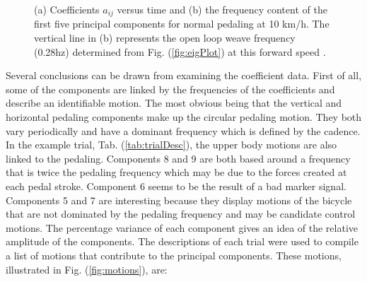 \begin{figure}[tb]
    \begin{center}
    \end{center}
    \caption{(a) Coefficients $a_{ij}$ versus time and (b) the frequency
    content of the first five principal components for normal pedaling at 10
    km/h. The vertical line in (b) represents the open loop weave frequency
    (0.28hz) determined from Fig. (\ref{fig:eigPlot}) at this forward speed .}
    \label{fig:3062}
\end{figure}
Several conclusions can be drawn from examining the coefficient data. First of
all, some of the components are linked by the frequencies of the coefficients
and describe an identifiable motion. The most obvious being that the vertical
and horizontal pedaling components make up the circular pedaling motion. They
both vary periodically and have a dominant frequency which is defined by the
cadence. In the example trial, Tab. (\ref{tab:trialDesc}), the upper body
motions are also linked to the pedaling. Components 8 and 9 are both based
around a frequency that is twice the pedaling frequency which may be due to the
forces created at each pedal stroke. Component 6 seems to be the result of a
bad marker signal. Components 5 and 7 are interesting because they display
motions of the bicycle that are not dominated by the pedaling frequency and may
be candidate control motions. The percentage variance of each component gives
an idea of the relative amplitude of the components. The descriptions of each
trial were used to compile a list of motions that contribute to the principal
components. These motions, illustrated in Fig. (\ref{fig:motions}), are:
